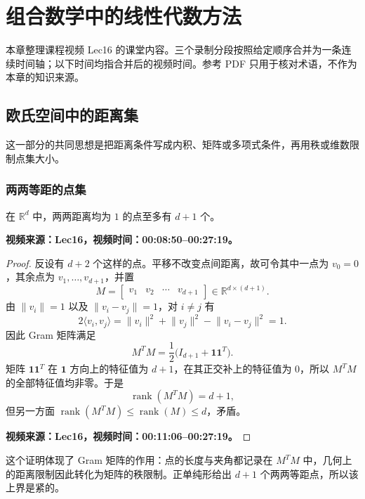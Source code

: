 \chapter{组合数学中的线性代数方法}
\label{ch:250526}

\ifdefined\VideoNotesTestMode
本章整理课程视频 Lec16 的课堂内容。三个录制分段按照给定顺序合并为一条连续时间轴；以下时间均指合并后的视频时间。参考 PDF 只用于核对术语，不作为本章的知识来源。
\fi

\section{欧氏空间中的距离集}

这一部分的共同思想是把距离条件写成内积、矩阵或多项式条件，再用秩或维数限制点集大小。

\subsection{两两等距的点集}

\begin{theorem}
在 $\mathbb{R}^d$ 中，两两距离均为 $1$ 的点至多有 $d+1$ 个。

\ifdefined\VideoNotesTestMode
\textbf{视频来源：Lec16，视频时间：00:08:50--00:27:19。}
\fi
\end{theorem}

\begin{proof}
反设有 $d+2$ 个这样的点。平移不改变点间距离，故可令其中一点为 $v_0=0$，其余点为 $v_1,\dots,v_{d+1}$，并置
\[
M=\begin{bmatrix}v_1&v_2&\cdots&v_{d+1}\end{bmatrix}
  \in\mathbb{R}^{d\times(d+1)}.
\]
由 $\lVert v_i\rVert=1$ 以及 $\lVert v_i-v_j\rVert=1$，对 $i\ne j$ 有
\[
2\langle v_i,v_j\rangle
=\lVert v_i\rVert^2+\lVert v_j\rVert^2-\lVert v_i-v_j\rVert^2=1.
\]
因此 Gram 矩阵满足
\[
M^TM=\frac12\bigl(I_{d+1}+\mathbf{1}\mathbf{1}^T\bigr).
\]
矩阵 $\mathbf{1}\mathbf{1}^T$ 在 $\mathbf{1}$ 方向上的特征值为 $d+1$，在其正交补上的特征值为 $0$，所以 $M^TM$ 的全部特征值均非零。于是
\[
\operatorname{rank}(M^TM)=d+1,
\]
但另一方面 $\operatorname{rank}(M^TM)\leq\operatorname{rank}(M)\leq d$，矛盾。

\ifdefined\VideoNotesTestMode
\textbf{视频来源：Lec16，视频时间：00:11:06--00:27:19。}
\fi
\end{proof}

这个证明体现了 Gram 矩阵的作用：点的长度与夹角都记录在 $M^TM$ 中，几何上的距离限制因此转化为矩阵的秩限制。正单纯形给出 $d+1$ 个两两等距点，所以该上界是紧的。


